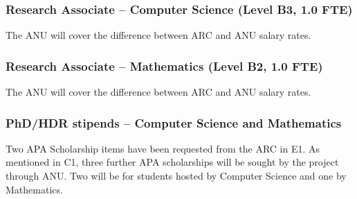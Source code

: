 \documentclass[a4paper,twoside,12pt,compact]{article}
\begin{document}
%
%




\subsubsection*{Research Associate – Computer Science (Level B3, 1.0 FTE)}

The ANU will cover the difference between ARC and ANU salary rates.


\subsubsection*{Research Associate – Mathematics (Level B2, 1.0 FTE)}

The ANU will cover the difference between ARC and ANU salary rates.

\subsubsection*{PhD/HDR stipends – Computer Science and Mathematics}

Two APA Scholarship items have been requested from the ARC in E1.
As mentioned in C1, three further APA scholarships will be 
sought by the project through ANU. Two will be for students
hosted by Computer Science and one by Mathematics.


\end{document}
